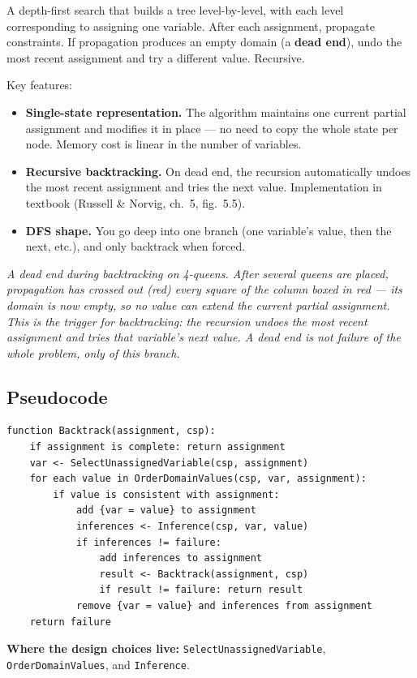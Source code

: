 \documentclass[11pt, a4paper]{article}
\begin{document}
\begin{defbox}
A depth-first search that builds a tree level-by-level, with each level corresponding to assigning one variable. After each assignment, propagate constraints. If propagation produces an empty domain (a \textbf{dead end}), undo the most recent assignment and try a different value. Recursive.
\end{defbox}

Key features:

\begin{itemize}
  \item \textbf{Single-state representation.} The algorithm maintains one current partial assignment and modifies it in place — no need to copy the whole state per node. Memory cost is linear in the number of variables.
  \item \textbf{Recursive backtracking.} On dead end, the recursion automatically undoes the most recent assignment and tries the next value. Implementation in textbook (Russell \& Norvig, ch.~5, fig.~5.5).
  \item \textbf{DFS shape.} You go deep into one branch (one variable's value, then the next, etc.), and only backtrack when forced.
\end{itemize}

\begin{center}

\footnotesize\textit{A dead end during backtracking on 4-queens. After several queens are placed, propagation has crossed out (red) every square of the column boxed in red --- its domain is now empty, so no value can extend the current partial assignment. This is the trigger for backtracking: the recursion undoes the most recent assignment and tries that variable's next value. A dead end is not failure of the whole problem, only of this branch.}
\end{center}

\subsection{Pseudocode}

\begin{exbox}
\begin{verbatim}
function Backtrack(assignment, csp):
    if assignment is complete: return assignment
    var <- SelectUnassignedVariable(csp, assignment)
    for each value in OrderDomainValues(csp, var, assignment):
        if value is consistent with assignment:
            add {var = value} to assignment
            inferences <- Inference(csp, var, value)
            if inferences != failure:
                add inferences to assignment
                result <- Backtrack(assignment, csp)
                if result != failure: return result
            remove {var = value} and inferences from assignment
    return failure
\end{verbatim}
\textbf{Where the design choices live:} \texttt{SelectUnassignedVariable}, \texttt{OrderDomainValues}, and \texttt{Inference}.
\end{exbox}
\end{document}
